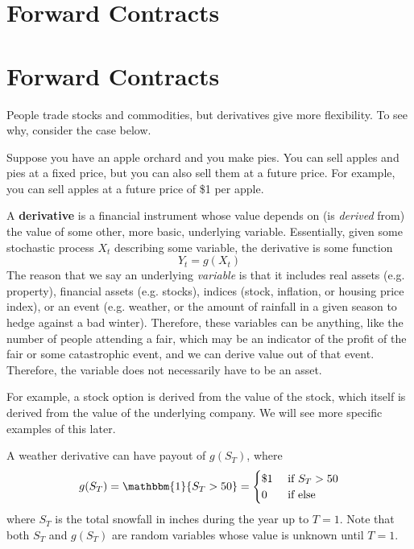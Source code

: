 \documentclass{article}
\begin{document}
\section{Forward Contracts}

  

\section{Forward Contracts} 

    People trade stocks and commodities, but derivatives give more flexibility. To see why, consider the case below. 

    \begin{example}
      Suppose you have an apple orchard and you make pies. You can sell apples and pies at a fixed price, but you can also sell them at a future price. For example, you can sell apples at a future price of \$1 per apple. 
    \end{example}

    \begin{definition}[Derivatives]
      A \textbf{derivative} is a financial instrument whose value depends on (is \textit{derived} from) the value of some other, more basic, underlying variable. Essentially, given some stochastic process $X_t$ describing some variable, the derivative is some function 
      \begin{equation}
        Y_t = g(X_t)
      \end{equation}
      The reason that we say an underlying \textit{variable} is that it includes real assets (e.g. property), financial assets (e.g. stocks), indices (stock, inflation, or housing price index), or an event (e.g. weather, or the amount of rainfall in a given season to hedge against a bad winter). Therefore, these variables can be anything, like the number of people attending a fair, which may be an indicator of the profit of the fair or some catastrophic event, and we can derive value out of that event. Therefore, the variable does not necessarily have to be an asset. 
    \end{definition}

    \begin{example}
      For example, a stock option is derived from the value of the stock, which itself is derived from the value of the underlying company. We will see more specific examples of this later. 
    \end{example}

    \begin{example}
      A weather derivative can have payout of $g(S_T)$, where 
      \begin{equation}
        g(S_T) = \mathbbm{1} \{S_T > 50\} = \begin{cases} \$1 & \text{ if } S_T > 50 \\ 0 & \text{ if else} \end{cases}
      \end{equation}
      where $S_T$ is the total snowfall in inches during the year up to $T = 1$. Note that both $S_T$ and $g(S_T)$ are random variables whose value is unknown until $T = 1$.
    \end{example}
\end{document}
